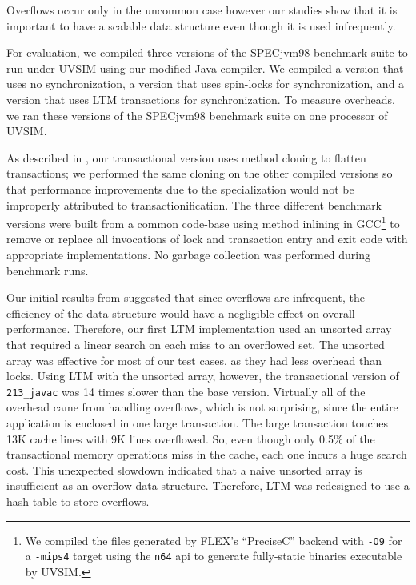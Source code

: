 Overflows occur only in the uncommon case
however our studies show that it is important to have a scalable data
structure even though it is used infrequently.

For evaluation, we compiled three versions of the SPECjvm98 benchmark
suite to run under UVSIM using our modified Java compiler. We compiled
a  version that uses no synchronization, a 
version that uses spin-locks for synchronization, and a 
version that uses LTM transactions for synchronization. To measure
overheads, we ran these versions of the SPECjvm98 benchmark suite on
one processor of UVSIM.

As described in , our transactional version uses method
cloning to flatten transactions; we performed the same cloning on the
other compiled versions so that performance improvements due to the
specialization would not be improperly attributed to
transactionification.  The three different benchmark versions were
built from a common code-base using method inlining in GCC\footnote{We
compiled the files generated by FLEX's ``PreciseC'' backend with
\texttt{-O9} for a \texttt{-mips4} target using the
\texttt{n64} api to generate fully-static binaries executable by
UVSIM.}  to remove or replace all invocations of lock and transaction
entry and exit code with appropriate implementations.  No garbage
collection was performed during benchmark runs.


\label{sec:javac}
Our initial results from  suggested that since
overflows are infrequent, the efficiency of the data structure would
have a negligible effect on overall performance. Therefore, our first
LTM implementation used an unsorted array that required a linear
search on each miss to an overflowed set. The unsorted array was
effective for most of our test cases, as they had less overhead than
locks.  Using LTM with the unsorted array, however, the transactional
version of \texttt{213\_javac} was 14 times slower than the base
version.  Virtually all of the overhead came from handling overflows,
which is not surprising, since the entire application is enclosed in
one large transaction. The large transaction touches 13K cache lines
with 9K lines overflowed.  So, even though only 0.5\% of the
transactional memory operations miss in the cache, each one incurs a
huge search cost. This unexpected slowdown indicated that a naive
unsorted array is insufficient as an overflow data
structure. Therefore, LTM was redesigned to use a hash table to store
overflows.

